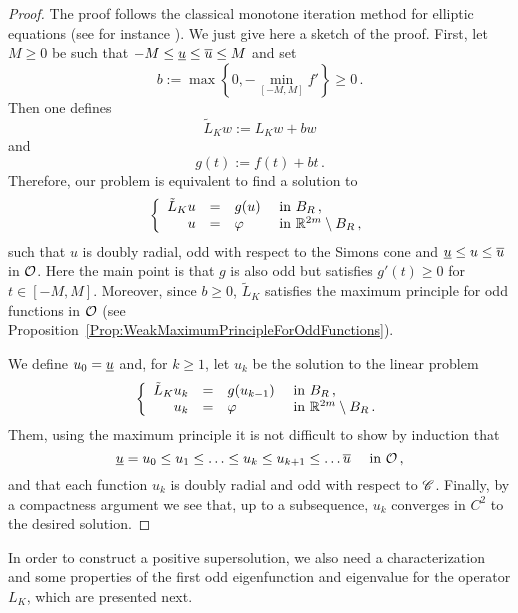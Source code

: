 \begin{proof}
	The proof follows the classical monotone iteration method for elliptic equations (see for instance \cite{Evans}). We just give here a sketch of the proof. 
	First, let $M \geq 0$ be such that $-M \leq \underline{u} \leq \overline{u} \leq M$ and set
	$$
	b := \max \left \{{0, - \min_{[-M,M]}f'}\right \}\geq 0\,.
	$$
	Then one defines 
	$$
	\tilde{L}_K w := L_Kw + b w
	$$
	and
	$$
	g(t) := f(t) + b t\,.
	$$
	Therefore, our problem is equivalent to find a solution to
	$$
	\left\{\begin{array}{rcll}
	\tilde{L}_Ku & = & g(u) & \textrm{ in } B_R\,, \\
	u &=& \varphi &  \textrm{ in } \mathbb{R}^{2m} \setminus B_R\,, 
	\end{array} \right.
	$$
	such that $u$ is doubly radial, odd with respect to the Simons cone and  $\underline{u} \leq u \leq \overline{u}$ in $\mathcal{O}$. Here the main point is that $g$ is also odd but satisfies $g'(t) \geq 0$ for $t \in [-M,M]$. Moreover, since $b \geq 0$, $\tilde{L}_K$ satisfies the maximum principle for odd functions in $\mathcal{O}$ (see Proposition~\ref{Prop:WeakMaximumPrincipleForOddFunctions}).
	
	We define $u_0 = \underline{u}$ and, for $k\geq 1$, let $u_k$ be the solution to the linear problem
	$$
	\left\{\begin{array}{rcll}
	\tilde{L}_K u_k & = & g(u_{k-1}) & \textrm{ in } B_R\,, \\
	u_k &=& \varphi &  \textrm{ in } \mathbb{R}^{2m} \setminus B_R\,. 
	\end{array} \right.
	$$
	Them, using the maximum principle it is not difficult to show by induction that 
	$$
	\underline{u} = u_0 \leq u_1 \leq \ldots \leq u_k \leq u_{k+1} \leq \ldots \overline{u} \quad \text{ in }\mathcal{O}\,,
	$$
	and that each function $u_k$ is doubly radial and odd with respect to $\mathscr{C}$. Finally, by a compactness  argument we see that, up to a subsequence, $u_k$ converges in $C^2$ to the desired solution.
\end{proof}

In order to construct a positive supersolution, we also need a characterization and some properties of the first odd eigenfunction and eigenvalue for the operator $L_K$, which are presented next.

